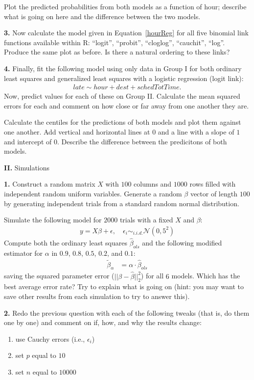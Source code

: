 \documentclass[12pt]{article}
\begin{document}
Plot the predicted probabilities from both models as a function of hour; describe
what is going on here and the difference between the two models.

{\bf 3.} Now calculate the model given in Equation~\ref{hourReg} for all five
binomial link functions available within R: ``logit'', ``probit'', ``cloglog'',
``cauchit'', ``log''. Produce the same plot as before. Is there a natural ordering
to these links?

{\bf 4.} Finally, fit the following model using only data in Group I for
both ordinary least squares and generalized least squares with a logistic
regression (logit link):
\begin{align}
late \sim hour + dest + schedTotTime.
\end{align}
Now, predict values for each of these on Group II. Calculate the mean squared
errors for each and comment on how close or far away from one another they
are.

Calculate the centiles for the predictions of both models and plot them against
one another. Add vertical and horizontal lines at $0$ and a line with a slope of
$1$ and intercept of $0$. Describe the difference between the predicitons of both
models.

{\bf II.} Simulations

{\bf 1.} Construct a random matrix $X$ with $100$ columns and $1000$ rows filled
with independent random uniform variables. Generate a random $\beta$ vector of length
$100$ by generating independent trials from a standard random normal distribution.

Simulate the following model for $2000$ trials with a fixed $X$ and $\beta$:
\begin{align}
y = X \beta + \epsilon, \quad \epsilon_i \sim_{i.i.d.} \mathcal{N}(0, 5^2)
\end{align}
Compute both the ordinary least squares $\widehat{\beta}_{ols}$ and the following
modified estimator for $\alpha$ in $0.9$, $0.8$, $0.5$, $0.2$, and $0.1$:
\begin{align}
\widetilde{\beta}_\alpha &= \alpha \cdot \widehat{\beta}_{ols}
\end{align}
saving the squared parameter error ($|| \beta - \widehat{\beta} ||_2^2$) for all
$6$ models. Which has the best average error rate? Try to explain what is going on
(hint: you may want to save other results from each simulation to try
to answer this).

{\bf 2.} Redo the previous question with each of the following tweaks (that is,
do them one by one) and comment on if, how, and why the results change:
\begin{enumerate} \renewcommand{\theenumi}{\Alph{enumi}}
\item use Cauchy errors (i.e., $\epsilon_i$)
\item set $p$ equal to $10$
\item set $n$ equal to $10000$
\end{enumerate}
\end{document}
